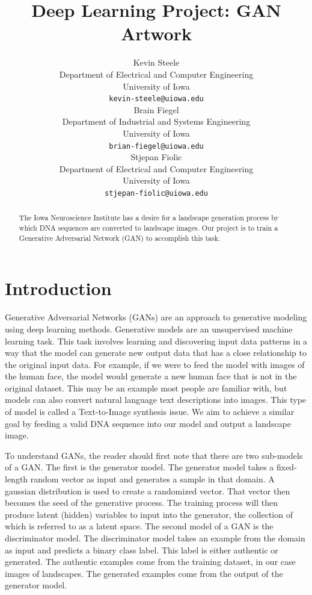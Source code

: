 \documentclass{article}
\title{Deep Learning Project: GAN Artwork}
\author{
	Kevin Steele \\
	Department of Electrical and Computer Engineering \\
	University of Iowa\\
	\texttt{kevin-steele@uiowa.edu} \\
	\And
	Brain Fiegel \\
	Department of Industrial and Systems Engineering \\
	University of Iowa\\
	\texttt{brian-fiegel@uiowa.edu} \\
	\And
	Stjepan Fiolic \\
	Department of Electrical and Computer Engineering \\
	University of Iowa\\
	\texttt{stjepan-fiolic@uiowa.edu} \\
}
\begin{document}
	\maketitle
	
	\begin{abstract}
		The Iowa Neuroscience Institute has a desire for a landscape generation process by which DNA sequences are converted to landscape images. Our project is to train a Generative Adversarial Network (GAN) to accomplish this task.
	\end{abstract}
	
	
	
	
	\section{Introduction}
	\label{sec:intro}
	
	Generative Adversarial Networks (GANs) are an approach to generative modeling using deep learning methods. Generative models are an unsupervised machine learning task.  This task involves learning and discovering input data patterns in a way that the model can generate new output data that has a close relationship to the original input data. For example, if we were to feed the model with images of the human face, the model would generate a new human face that is not in the original dataset. This may be an example most people are familiar with, but models can also convert natural language text descriptions into images.  This type of model is called a Text-to-Image synthesis issue. We aim to achieve a similar goal by feeding a valid DNA sequence into our model and output a landscape image. 
	
	To understand GANs, the reader should first note that there are two sub-models of a GAN. The first is the generator model. The generator model takes a fixed-length random vector as input and generates a sample in that domain. A gaussian distribution is used to create a randomized vector. That vector then becomes the seed of the generative process. The training process will then produce latent (hidden) variables to input into the generator, the collection of which is referred to as a latent space. The second model of a GAN is the discriminator model. The discriminator model takes an example from the domain as input and predicts a binary class label.  This label is either authentic or generated. The authentic examples come from the training dataset, in our case images of landscapes. The generated examples come from the output of the generator model.  
	
\end{document}

